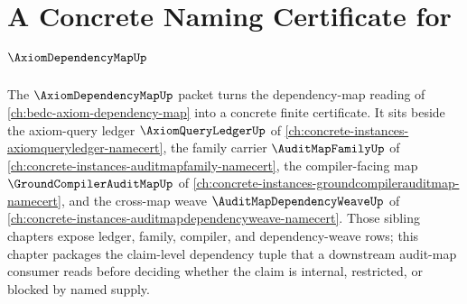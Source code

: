 \chapter{A Concrete Naming Certificate for $\AxiomDependencyMapUp$}
\label{ch:concrete-instances-axiomdependencymap-namecert}

The $\AxiomDependencyMapUp$ packet turns the dependency-map reading of \autoref{ch:bedc-axiom-dependency-map} into a concrete finite certificate. It sits beside the axiom-query ledger $\AxiomQueryLedgerUp$ of \autoref{ch:concrete-instances-axiomqueryledger-namecert}, the family carrier $\AuditMapFamilyUp$ of \autoref{ch:concrete-instances-auditmapfamily-namecert}, the compiler-facing map $\GroundCompilerAuditMapUp$ of \autoref{ch:concrete-instances-groundcompilerauditmap-namecert}, and the cross-map weave $\AuditMapDependencyWeaveUp$ of \autoref{ch:concrete-instances-auditmapdependencyweave-namecert}. Those sibling chapters expose ledger, family, compiler, and dependency-weave rows; this chapter packages the claim-level dependency tuple that a downstream audit-map consumer reads before deciding whether the claim is internal, restricted, or blocked by named supply.

